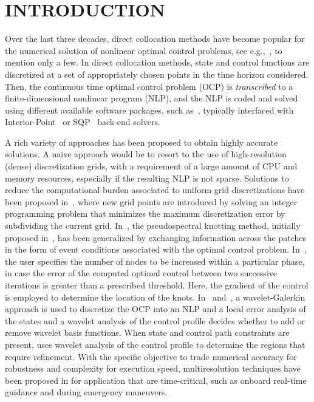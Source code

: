 \section*{INTRODUCTION}

Over the last three decades, direct collocation methods have become popular for the numerical solution of nonlinear optimal control problems, see e.g.,~\cite{Fahroo:JGCD:2002,Elnager:TAC:1995,Fahroo:JAS:2000,Gong:AAS:2006}, to mention only a few. In direct collocation methods, state and control functions are discretized at a set of appropriately chosen points in the time horizon considered. Then, the continuous time optimal control problem (OCP) is \emph{transcribed} to a finite-dimensional nonlinear program (NLP), and the NLP is coded and solved using different available software packages, such as~\cite{casadi:MPC:2019, Rao:TMS:2010,GPOPSII:TMS:2013}, typically interfaced with Interior-Point~\cite{Biegler:CCE:2009} or SQP~\cite{SNOPT:SIAMReview:2005} back-end solvers.

A rich variety of approaches has been proposed to obtain highly accurate solutions. A na\"{i}ve approach would be to resort to the use of high-resolution (dense) discretization grids, with a requirement of a large amount of CPU and memory resources, especially if the resulting NLP is not sparse. Solutions to reduce the computational burden associated to uniform grid discretizations have been proposed in~\cite{Betts:JCAM:2000}, where new grid points are introduced by solving an integer programming problem that minimizes the
maximum discretization error by subdividing the current grid. In~\cite{Ross:AAS:2003}, the pseudospectral knotting method, initially proposed in~\cite{Fahroo:ASC:2000}, has been generalized by exchanging information across the patches in the form of event conditions associated with the optimal control problem. In~\cite{Gong:AAS:2006}, the user specifies the number of nodes to be increased within a particular phase, in case the error of the computed optimal control between two successive iterations is
greater than a prescribed threshold. Here, the
gradient of the control is employed to determine the location of
the knots. In~\cite{Binder:CCE:2000} and~\cite{Binder:TechRep:2000}, a wavelet-Galerkin approach is used to discretize the OCP into an NLP and a local error analysis of the states and a wavelet analysis of the
control profile decides whether to add or remove wavelet basis functions. When state and control path constraints are present, \cite{Schlegel:CCE:2005}  uses wavelet analysis of the control profile to determine the
regions that require refinement. 
With the specific objective to trade numerical accuracy for robustness and complexity for execution speed, multiresolution techniques have been proposed in \cite{Jain:CDC:2007,Jain:JGCD:2008} for application that are time-critical, such as onboard real-time guidance and during emergency maneuvers.

